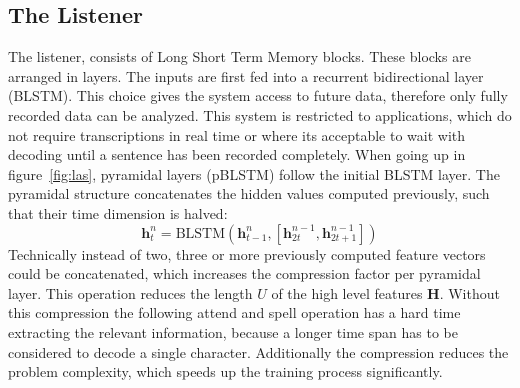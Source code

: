 \subsection{The Listener}
The listener, consists of Long Short Term Memory blocks. These blocks are arranged in layers. The inputs are first fed into a recurrent bidirectional layer (BLSTM). This choice gives the system access to future data, therefore only fully recorded data can be analyzed. This system is restricted to applications, which do not require transcriptions in real time or where its acceptable to wait with decoding until a sentence has been recorded completely. When going up in figure~\ref*{fig:las}, pyramidal layers (pBLSTM) follow the initial BLSTM layer. The pyramidal structure concatenates the hidden values computed previously, such that their time dimension is halved:
\begin{equation}
\mathbf{h}_{t}^n = \text{BLSTM}(\mathbf{h}_{t-1}^{n}, [\mathbf{h}_{2t}^{n-1}, \mathbf{h}_{2t+1}^{n-1}])
\end{equation}
Technically instead of two, three or more previously computed feature vectors could be concatenated, which increases the compression factor per pyramidal layer. 
This operation reduces the length $U$ of the high level features $\mathbf{H}$. Without this compression the following attend and spell operation has a hard time extracting the relevant information, because a longer time span has to be considered to decode a single character. Additionally the compression reduces the problem complexity, which speeds up the training process significantly.

